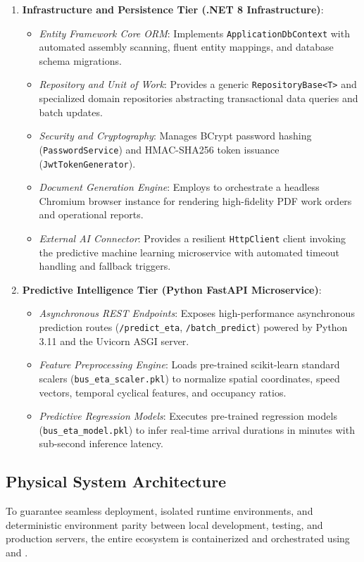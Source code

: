 \begin{enumerate}
  \item \textbf{Infrastructure and Persistence Tier (.NET 8 Infrastructure)}:
  \begin{itemize}
    \item \emph{Entity Framework Core ORM}: Implements \texttt{ApplicationDbContext} with automated assembly scanning, fluent entity mappings, and database schema migrations.
    \item \emph{Repository and Unit of Work}: Provides a generic \texttt{RepositoryBase<T>} and specialized domain repositories abstracting transactional data queries and batch updates.
    \item \emph{Security and Cryptography}: Manages BCrypt password hashing (\texttt{PasswordService}) and HMAC-SHA256 token issuance (\texttt{JwtTokenGenerator}).
    \item \emph{Document Generation Engine}: Employs  to orchestrate a headless Chromium browser instance for rendering high-fidelity PDF work orders and operational reports.
    \item \emph{External AI Connector}: Provides a resilient \texttt{HttpClient} client invoking the predictive machine learning microservice with automated timeout handling and fallback triggers.
  \end{itemize}

  \item \textbf{Predictive Intelligence Tier (Python FastAPI Microservice)}:
  \begin{itemize}
    \item \emph{Asynchronous REST Endpoints}: Exposes high-performance asynchronous prediction routes (\texttt{/predict\_eta}, \texttt{/batch\_predict}) powered by Python 3.11 and the Uvicorn ASGI server.
    \item \emph{Feature Preprocessing Engine}: Loads pre-trained scikit-learn standard scalers (\texttt{bus\_eta\_scaler.pkl}) to normalize spatial coordinates, speed vectors, temporal cyclical features, and occupancy ratios.
    \item \emph{Predictive Regression Models}: Executes pre-trained regression models (\texttt{bus\_eta\_model.pkl}) to infer real-time arrival durations in minutes with sub-second inference latency.
  \end{itemize}
\end{enumerate}

\subsection{Physical System Architecture}
\label{subsec:physical_architecture}
To guarantee seamless deployment, isolated runtime environments, and deterministic environment parity between local development, testing, and production servers, the entire  ecosystem is containerized and orchestrated using  and .

